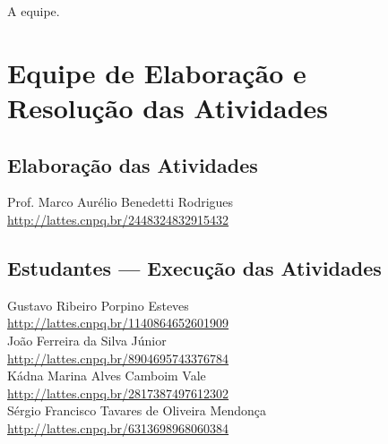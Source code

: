 \documentclass[
	12pt,				%
	openright,			%
  oneside,     %
	a4paper,			%
	english,			%
	french,				%
	spanish,			%
	brazil				%
	]{abntex2}
\begin{document}
\hfill A equipe.

\newpage


\chapter*[Equipe de Elaboração e \\Resolução das Atividades]{Equipe de Elaboração e \\Resolução das Atividades}

\section*{Elaboração das Atividades}

\noindent Prof. Marco Aurélio Benedetti Rodrigues\\
\url{http://lattes.cnpq.br/2448324832915432}\\

\section*{Estudantes --- Execução das Atividades}

\noindent Gustavo Ribeiro Porpino Esteves\\
\url{http://lattes.cnpq.br/1140864652601909}\\

\noindent João Ferreira da Silva Júnior\\
\url{http://lattes.cnpq.br/8904695743376784}\\

\noindent Kádna Marina Alves Camboim Vale\\
\url{http://lattes.cnpq.br/2817387497612302}\\

\noindent Sérgio Francisco Tavares de Oliveira Mendonça\\
\url{http://lattes.cnpq.br/6313698968060384}\\

\newpage


\frenchspacing 
\end{document}
